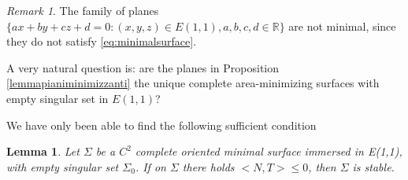 \documentclass[10pt]{amsart}
\newtheorem{lemma}[theorem]{Lemma}
\theoremstyle{definition}
\theoremstyle{remark}
\newtheorem{remark}[theorem]{Remark}
\numberwithin{equation}{section}
\begin{document}
\begin{remark}
The family of planes $\{ ax+by+cz+d=0: (x,y,z)\in{E(1,1)}, a,b,c,d \in{{\mathbb{R}}}\}$ are not minimal, since they do not satisfy \eqref{eq:minimalsurface}.
\end{remark}

A very natural question is: are the planes in Proposition \ref{lemmapianiminimizzanti} the unique complete area-minimizing surfaces with empty singular set in ${E(1,1)}$? 

We have only been able to find the following sufficient condition

\begin{lemma}\label{lem:sufficientstabilityempty}  Let ${\Sigma}$ be a $C^2$ complete oriented minimal surface immersed in {E(1,1)}, with empty singular set ${\Sigma}_0$. If on ${\Sigma}$ there holds ${\big<{N,T}\big>}{\leqslant} 0$, then ${\Sigma}$ is stable.
\end{lemma}
\end{document}
